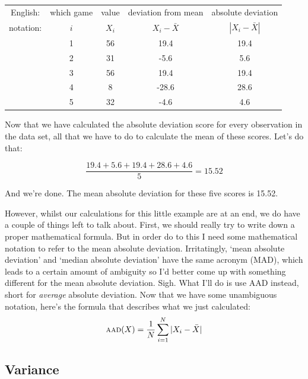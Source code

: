 \documentclass[
]{book}
\begin{document}
\vspace{0.5cm}
\begin{center}
\begin{tabular}{ccccc} 
English: & which game & value & deviation from mean & absolute deviation \\
notation: & $i$ & $X_i$ & $X_i - \bar{X}$ &  $|X_i - \bar{X}|$ \\ \hline
& 1 & 56 & 19.4  & 19.4\\
& 2 & 31 &  -5.6 & 5.6\\ 
& 3 & 56 & 19.4  & 19.4\\
& 4 & 8 & -28.6  & 28.6\\
& 5 & 32 & -4.6  & 4.6 \\
\end{tabular}
\end{center}

Now that we have calculated the absolute deviation score for every observation in the data set, all that we have to do to calculate the mean of these scores. Let's do that:

\[
\frac{19.4 + 5.6 + 19.4 + 28.6 + 4.6}{5} = 15.52
\]

And we're done. The mean absolute deviation for these five scores is 15.52.

However, whilst our calculations for this little example are at an end, we do have a couple of things left to talk about. First, we should really try to write down a proper mathematical formula. But in order do to this I need some mathematical notation to refer to the mean absolute deviation. Irritatingly, `mean absolute deviation' and `median absolute deviation' have the same acronym (MAD), which leads to a certain amount of ambiguity so I'd better come up with something different for the mean absolute deviation. Sigh. What I'll do is use AAD instead, short for \emph{average} absolute deviation. Now that we have some unambiguous notation, here's the formula that describes what we just calculated:
\[
\mbox{\textsc{aad}}(X) = \frac{1}{N} \sum_{i = 1}^N |X_i - \bar{X}|
\]

\hypertarget{variance}{%
\subsection{Variance}\label{variance}}
\end{document}
